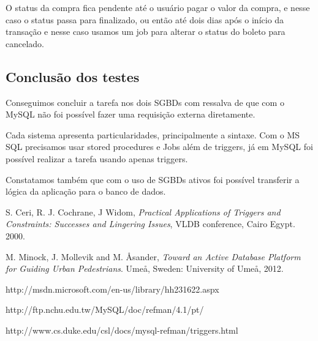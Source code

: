 \documentclass[conference]{IEEEtran}
\begin{document}
    O status da compra fica pendente até o usuário pagar o valor da compra, e nesse caso o status passa para finalizado, ou então até dois dias após o início da transação e nesse caso usamos um job para alterar o status do boleto para cancelado.

  \subsection{Conclusão dos testes}
    Conseguimos concluir a tarefa nos dois SGBDs com ressalva de que com o MySQL não foi possível fazer uma requisição externa diretamente.

	Cada sistema apresenta particularidades, principalmente a sintaxe. Com o MS SQL precisamos usar stored procedures e Jobs além de triggers, já em MySQL foi possível realizar a tarefa usando apenas triggers.

	Constatamos também que com o uso de SGBDs ativos foi possível transferir a lógica da aplicação para o banco de dados.


\begin{thebibliography}{1}

  S. Ceri, R. J. Cochrane, J Widom, \textit{Practical Applications of Triggers and Constraints: Successes and Lingering Issues}, VLDB conference, Cairo Egypt. 2000.

  M. Minock, J. Mollevik and M. \r{A}sander, \textit{Toward an Active Database Platform for Guiding Urban Pedestrians}. Ume\r{a}, Sweden: University of Ume\r{a}, 2012.

http://msdn.microsoft.com/en-us/library/hh231622.aspx

  http://ftp.nchu.edu.tw/MySQL/doc/refman/4.1/pt/

  http://www.cs.duke.edu/csl/docs/mysql-refman/triggers.html
\end{thebibliography}
\end{document}
